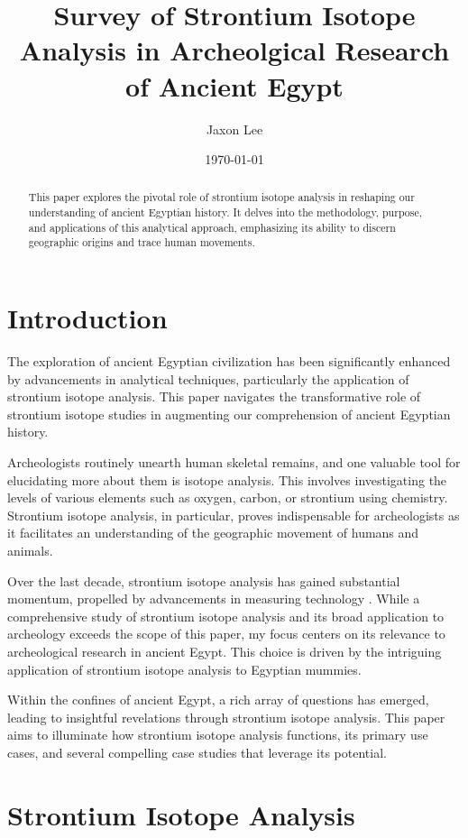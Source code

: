 \documentclass[a4paper, 12pt]{article}
\title{Survey of Strontium Isotope Analysis in Archeolgical Research of Ancient Egypt}
\author{Jaxon Lee}
\date{\today}
\begin{document}
\maketitle

\begin{abstract}
    This paper explores the pivotal role of strontium isotope analysis in
    reshaping our understanding of ancient Egyptian history. It delves into
    the methodology, purpose, and applications of this analytical approach,
    emphasizing its ability to discern geographic origins and trace human movements.
\end{abstract}

\section{Introduction}
The exploration of ancient Egyptian civilization has been significantly enhanced by
advancements in analytical techniques, particularly the application of strontium
isotope analysis. This paper navigates the transformative role of strontium isotope
studies in augmenting our comprehension of ancient Egyptian history.

Archeologists routinely unearth human skeletal remains, and one valuable tool for
elucidating more about them is isotope analysis. This involves investigating the
levels of various elements such as oxygen, carbon, or strontium using chemistry.
Strontium isotope analysis, in particular, proves indispensable for archeologists
as it facilitates an understanding of the geographic movement of humans and animals.

Over the last decade, strontium isotope analysis has gained substantial momentum,
propelled by advancements in measuring technology \citep{holt2021}. While a
comprehensive study of strontium isotope analysis and its broad application to archeology
exceeds the scope of this paper, my focus centers on its relevance to archeological
research in ancient Egypt. This choice is driven by the intriguing application of
strontium isotope analysis to Egyptian mummies.

Within the confines of ancient Egypt, a rich array of questions has emerged, leading
to insightful revelations through strontium isotope analysis. This paper aims to
illuminate how strontium isotope analysis functions, its primary use cases, and several
compelling case studies that leverage its potential.

\section{Strontium Isotope Analysis}
\end{document}
